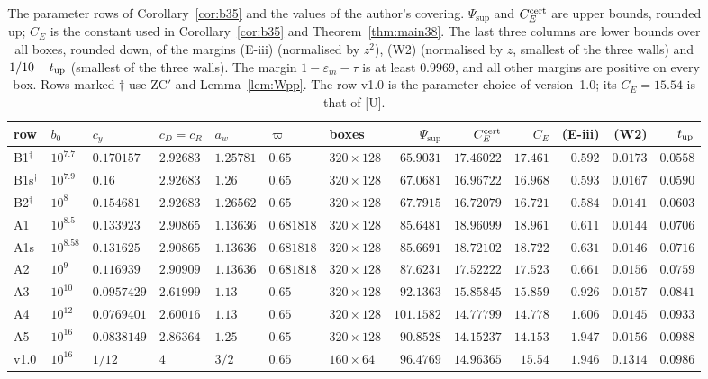 \documentclass[11pt]{amsart}
\theoremstyle{definition}
\theoremstyle{remark}
\numberwithin{equation}{section}
\begin{document}
\begin{table}[ht]
\centering
\footnotesize
\setlength{\tabcolsep}{2.9pt}
\begin{tabular}{lllllllrrrrrr}
\toprule
row & $b_0$ & $c_y$ & $c_D=c_R$ & $a_w$ & $\varpi$ & boxes & $\Psi_{\sup}$ & $C_E^{\rm cert}$ & $C_E$ & (E-iii) & (W2) &
$t_{\rm up}$\\
\midrule
B1$^\dagger$ & $10^{7.7}$ & $0.170157$ & $2.92683$ & $1.25781$ & $0.65$ & $320\times128$ & $65.9031$ & $17.46022$ & $17.461$ & $0.592$ & $0.0173$ & $0.0558$\\
B1s$^\dagger$ & $10^{7.9}$ & $0.16$ & $2.92683$ & $1.26$ & $0.65$ & $320\times128$ & $67.0681$ & $16.96722$ & $16.968$ & $0.593$ & $0.0167$ & $0.0590$\\
B2$^\dagger$ & $10^{8}$ & $0.154681$ & $2.92683$ & $1.26562$ & $0.65$ & $320\times128$ & $67.7915$ & $16.72079$ & $16.721$ & $0.584$ & $0.0141$ & $0.0603$\\
A1 & $10^{8.5}$ & $0.133923$ & $2.90865$ & $1.13636$ & $0.681818$ & $320\times128$ & $85.6481$ & $18.96099$ & $18.961$ & $0.611$ & $0.0144$ & $0.0706$\\
A1s & $10^{8.58}$ & $0.131625$ & $2.90865$ & $1.13636$ & $0.681818$ & $320\times128$ & $85.6691$ & $18.72102$ & $18.722$ & $0.631$ & $0.0146$ & $0.0716$\\
A2 & $10^{9}$ & $0.116939$ & $2.90909$ & $1.13636$ & $0.681818$ & $320\times128$ & $87.6231$ & $17.52222$ & $17.523$ & $0.661$ & $0.0156$ & $0.0759$\\
A3 & $10^{10}$ & $0.0957429$ & $2.61999$ & $1.13$ & $0.65$ & $320\times128$ & $92.1363$ & $15.85845$ & $15.859$ & $0.926$ & $0.0157$ & $0.0841$\\
A4 & $10^{12}$ & $0.0769401$ & $2.60016$ & $1.13$ & $0.65$ & $320\times128$ & $101.1582$ & $14.77799$ & $14.778$ & $1.606$ & $0.0145$ & $0.0933$\\
A5 & $10^{16}$ & $0.0838149$ & $2.86364$ & $1.25$ & $0.65$ & $320\times128$ & $90.8528$ & $14.15237$ & $14.153$ & $1.947$ & $0.0156$ & $0.0988$\\
\midrule
v1.0 & $10^{16}$ & $1/12$ & $4$ & $3/2$ & $0.65$ & $160\times64$ & $96.4769$ & $14.96365$ & $15.54$ & $1.946$ & $0.1314$ & $0.0986$\\
\bottomrule
\end{tabular}
\medskip
\caption{The parameter rows of Corollary~\ref{cor:b35} and the values of the author's covering. $\Psi_{\sup}$ and
$C_E^{\rm cert}$ are upper bounds, rounded up; $C_E$ is the constant used in Corollary~\ref{cor:b35} and
Theorem~\ref{thm:main38}. The last three columns are lower bounds over all boxes, rounded down, of the margins (E-iii)
(normalised by $z^2$), (W2) (normalised by $z$, smallest of the three walls) and $1/10-t_{\rm up}$ (smallest of the three
walls). The margin $1-\varepsilon_m-\tau$ is at least $0.9969$, and all other margins are positive on every box.
Rows marked $\dagger$ use ZC$'$ and Lemma~\ref{lem:Wpp}.
The row v1.0 is the parameter choice of version~1.0; its $C_E=15.54$ is that of [U].}\label{tab:certtiers}
\end{table}
\end{document}
